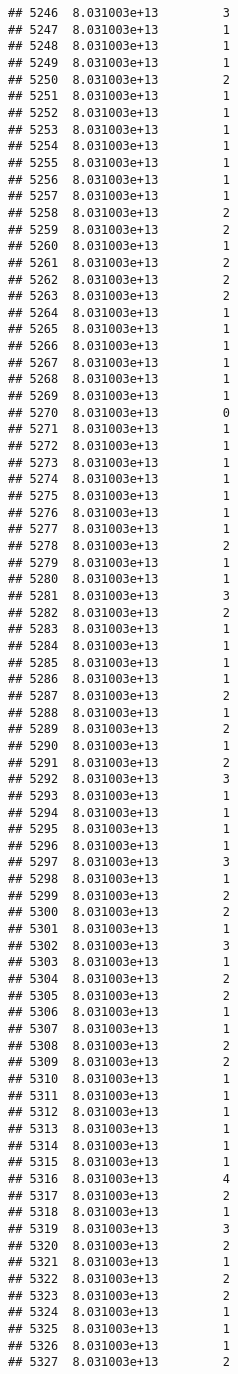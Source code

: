 \documentclass[
]{article}
\begin{document}
\begin{verbatim}
## 5246  8.031003e+13         3
## 5247  8.031003e+13         1
## 5248  8.031003e+13         1
## 5249  8.031003e+13         1
## 5250  8.031003e+13         2
## 5251  8.031003e+13         1
## 5252  8.031003e+13         1
## 5253  8.031003e+13         1
## 5254  8.031003e+13         1
## 5255  8.031003e+13         1
## 5256  8.031003e+13         1
## 5257  8.031003e+13         1
## 5258  8.031003e+13         2
## 5259  8.031003e+13         2
## 5260  8.031003e+13         1
## 5261  8.031003e+13         2
## 5262  8.031003e+13         2
## 5263  8.031003e+13         2
## 5264  8.031003e+13         1
## 5265  8.031003e+13         1
## 5266  8.031003e+13         1
## 5267  8.031003e+13         1
## 5268  8.031003e+13         1
## 5269  8.031003e+13         1
## 5270  8.031003e+13         0
## 5271  8.031003e+13         1
## 5272  8.031003e+13         1
## 5273  8.031003e+13         1
## 5274  8.031003e+13         1
## 5275  8.031003e+13         1
## 5276  8.031003e+13         1
## 5277  8.031003e+13         1
## 5278  8.031003e+13         2
## 5279  8.031003e+13         1
## 5280  8.031003e+13         1
## 5281  8.031003e+13         3
## 5282  8.031003e+13         2
## 5283  8.031003e+13         1
## 5284  8.031003e+13         1
## 5285  8.031003e+13         1
## 5286  8.031003e+13         1
## 5287  8.031003e+13         2
## 5288  8.031003e+13         1
## 5289  8.031003e+13         2
## 5290  8.031003e+13         1
## 5291  8.031003e+13         2
## 5292  8.031003e+13         3
## 5293  8.031003e+13         1
## 5294  8.031003e+13         1
## 5295  8.031003e+13         1
## 5296  8.031003e+13         1
## 5297  8.031003e+13         3
## 5298  8.031003e+13         1
## 5299  8.031003e+13         2
## 5300  8.031003e+13         2
## 5301  8.031003e+13         1
## 5302  8.031003e+13         3
## 5303  8.031003e+13         1
## 5304  8.031003e+13         2
## 5305  8.031003e+13         2
## 5306  8.031003e+13         1
## 5307  8.031003e+13         1
## 5308  8.031003e+13         2
## 5309  8.031003e+13         2
## 5310  8.031003e+13         1
## 5311  8.031003e+13         1
## 5312  8.031003e+13         1
## 5313  8.031003e+13         1
## 5314  8.031003e+13         1
## 5315  8.031003e+13         1
## 5316  8.031003e+13         4
## 5317  8.031003e+13         2
## 5318  8.031003e+13         1
## 5319  8.031003e+13         3
## 5320  8.031003e+13         2
## 5321  8.031003e+13         1
## 5322  8.031003e+13         2
## 5323  8.031003e+13         2
## 5324  8.031003e+13         1
## 5325  8.031003e+13         1
## 5326  8.031003e+13         1
## 5327  8.031003e+13         2

\end{verbatim}
\end{document}
